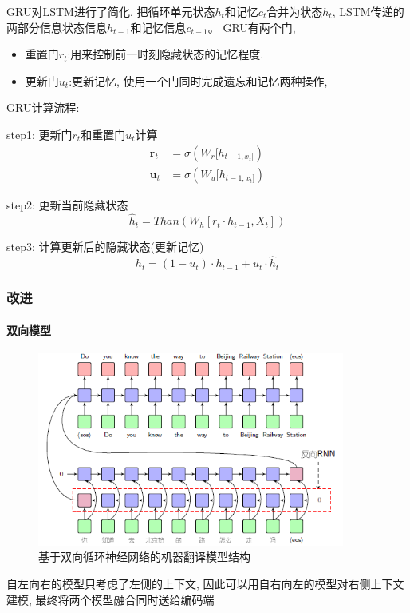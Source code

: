 \documentclass[a4paper]{article}
\begin{document}
GRU对LSTM进行了简化, 把循环单元状态$h_t$和记忆$c_t$合并为状态$h_t$, 
LSTM传递的两部分信息状态信息$h_{t−1}$和记忆信息$c_{t−1}$。
GRU有两个门, 
\begin{itemize}
    \item 重置门$r_t$:用来控制前一时刻隐藏状态的记忆程度.
    \item 更新门$u_t$:更新记忆, 使用一个门同时完成遗忘和记忆两种操作, 
\end{itemize}

GRU计算流程:

step1: 更新门$r_t$和重置门$u_t$计算
\begin{align*}
\mathbf{r}_t  & =\sigma(W_r[h_{t-1, x_t]}) \\
\mathbf{u}_t &  =\sigma(W_u[h_{t-1, x_t]})
\end{align*} 

step2: 更新当前隐藏状态 
$$\hat{h}_t=Than(W_h[r_t \cdot h_{t-1}, X_t])$$

step3: 计算更新后的隐藏状态(更新记忆)
$$h_t=(1-u_t) \cdot h_{t-1} + u_t\cdot \hat{h}_t$$

\subsubsection{改进}
\paragraph{双向模型}

\begin{figure}[htp]
    \centering
    \includegraphics[width=0.9\textwidth]{dual_direction_ML.png}
    \caption{基于双向循环神经网络的机器翻译模型结构}
    \end{figure}
自左向右的模型只考虑了左侧的上下文, 因此可以用自右向左的模型对右侧上下文建模, 最终将两个模型融合同时送给编码端
\end{document}
